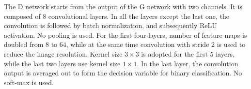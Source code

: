 \documentclass{journal}
\begin{document}




The D network starts from the output of the G network with two channels. It is composed of $8$ convolutional layers. In all the layers except the last one, the convolution is followed by batch normalization, and subsequently ReLU activation. No pooling is used. For the first four layers, number of feature maps is doubled from $8$ to $64$, while at the same time convolution with stride $2$ is used to reduce the image resolution. Kernel size $3 \times 3$ is adopted for the first 5 layers, while the last two layers use kernel size $1 \times 1$. In the last layer, the convolution output is averaged out to form the decision variable for binary classification. No soft-max is used.  




\end{document}
